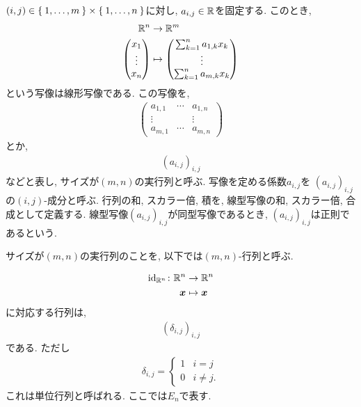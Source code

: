 \begin{definition}
$(i,j)\in\Set{1,\ldots,m}\times \Set{1,\ldots,n}$に対し,
$a_{i,j}\in\mathbb{R}$を固定する.
このとき,
\begin{align*}
  \mathbb{R}^n&\to \mathbb{R}^m\\
  \begin{pmatrix}x_1\\\vdots\\x_n\end{pmatrix}&\mapsto
    \begin{pmatrix}\sum_{k=1}^n a_{1,k}x_k\\\vdots\\\sum_{k=1}^n a_{m,k}x_k\end{pmatrix}
\end{align*}
という写像は線形写像である.
この写像を,
\begin{align*}
  \begin{pmatrix}
    a_{1,1}&\cdots &a_{1,n}\\
    \vdots& &\vdots\\
    a_{m,1}&\cdots &a_{m,n}
  \end{pmatrix}
\end{align*}
とか,
\begin{align*}
  (a_{i,j})_{i,j}
\end{align*}
などと表し,
サイズが$(m,n)$の実行列と呼ぶ.
写像を定める係数$a_{i,j}$を
$(a_{i,j})_{i,j}$の$(i,j)$-成分と呼ぶ.
行列の和, スカラー倍, 積を,
線型写像の和, スカラー倍, 合成として定義する.
線型写像$(a_{i,j})_{i,j}$が同型写像であるとき,
$(a_{i,j})_{i,j}$は正則であるという.
\end{definition}
\begin{remark}
  サイズが$(m,n)$の実行列のことを,
以下では$(m,n)$-行列と呼ぶ.
\end{remark}
\begin{remark}
\begin{align*}
\operatorname{id}_{\mathbb{R}^n} \colon \mathbb{R}^n&\to \mathbb{R}^n\\
 \boldsymbol{x} &\mapsto \boldsymbol{x}
\end{align*}
  に対応する行列は,
\begin{align*}
  (\delta_{i,j})_{i,j}
\end{align*}
である.
ただし
\begin{align*}
  \delta_{i,j}=
  \begin{cases}
    1&i=j\\
    0&i\neq j.
  \end{cases}
\end{align*}
これは単位行列と呼ばれる.
ここでは$E_n$で表す.
\end{remark}


